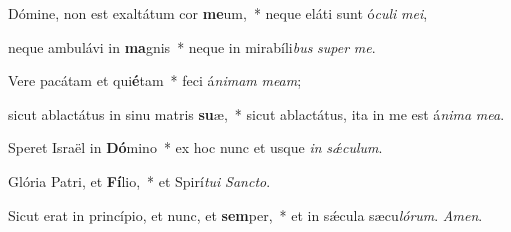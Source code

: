 \item Dómine, non est exaltátum cor \textbf{me}um,~* neque eláti sunt ó\textit{culi} \textit{mei},

\item neque ambulávi in \textbf{ma}gnis~* neque in mirabíli\textit{bus} \textit{super} \textit{me}.

\item Vere pacátam et qui\textbf{é}tam~* feci á\textit{nimam} \textit{meam};

\item sicut ablactátus in sinu matris \textbf{su}æ,~* sicut ablactátus, ita in me est á\textit{nima} \textit{mea}.

\item Speret Israël in \textbf{Dó}mino~* ex hoc nunc et usque \textit{in} \textit{sǽculum}.

\item Glória Patri, et \textbf{Fí}lio,~* et Spirí\textit{tui} \textit{Sancto}.

\item Sicut erat in princípio, et nunc, et \textbf{sem}per,~* et in sǽcula sæcu\textit{lórum}. \textit{Amen}.